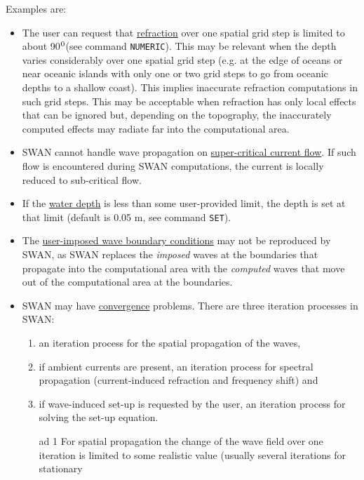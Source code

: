 \documentclass[12pt]{book}
\begin{document}
Examples are:
\begin{itemize}
  \item The user can request that \underline{refraction} over one spatial grid step is limited to about
        90$^{{\rm 0}}$(see command {\tt NUMERIC}). This may be relevant when the depth varies considerably
        over one spatial grid step (e.g. at the edge of oceans or near oceanic islands with only
        one or two grid steps to go from oceanic depths to a shallow coast). This implies
        inaccurate refraction computations in such grid steps. This may be acceptable when
        refraction has only local effects that can be ignored but, depending on the topography,
        the inaccurately computed effects may radiate far into the computational area.
  \item SWAN cannot handle wave propagation on \underline{super-critical current flow}. If such flow is
        encountered during SWAN computations, the current is locally reduced to sub-critical flow.
  \item If the \underline{water depth} is less than some user-provided limit, the depth is set at that limit
        (default is 0.05 m, see command {\tt SET}).
  \item The \underline{user-imposed wave boundary conditions} may not be reproduced by SWAN,
        as SWAN replaces the {\it imposed} waves at the boundaries that
        propagate into the computational area with the {\it computed} waves that move out of the computational
        area at the boundaries.
  \item SWAN may have \underline{convergence} problems. There are three iteration processes in SWAN:
        \begin{enumerate}
           \item an iteration process for the spatial propagation of the waves,
           \item if ambient currents are present, an iteration process for spectral propagation
                 (current-induced refraction and frequency shift) and
           \item if wave-induced set-up is requested by the user, an iteration process for
                 solving the set-up equation.
        \end{enumerate}
        \begin{itemize}
           \item[ad 1] For spatial propagation the change of the wave field over one iteration is
                       limited to some realistic value (usually several iterations for stationary

\end{itemize}
\end{itemize}
\end{document}
